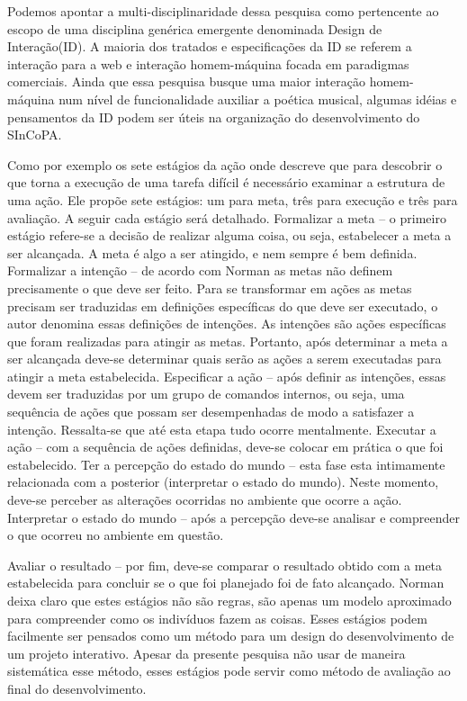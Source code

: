 \documentclass[draft]{ppgmus}
\begin{document}
Podemos apontar a multi-disciplinaridade dessa pesquisa como pertencente 
ao escopo de uma disciplina genérica emergente denominada Design de Interação(ID).
A maioria dos tratados e especificações da ID se referem a interação para a web
e interação homem-máquina focada em paradigmas comerciais. Ainda que essa pesquisa busque
uma maior interação homem-máquina num nível de funcionalidade auxiliar a poética musical, algumas idéias e 
pensamentos da ID podem ser úteis na organização do desenvolvimento do SInCoPA. 

Como por exemplo os sete estágios da ação \cite{norman06:design} onde descreve que para 
descobrir o que torna a
execução de uma tarefa difícil é necessário examinar a
estrutura de uma ação. Ele propõe sete estágios: um para
meta, três para execução e três para avaliação. A seguir cada
estágio será detalhado.
Formalizar a meta – o primeiro estágio refere-se a decisão de
realizar alguma coisa, ou seja, estabelecer a meta a ser
alcançada. A meta é algo a ser atingido, e nem sempre é bem
definida.
Formalizar a intenção – de acordo com Norman as
metas não definem precisamente o que deve ser feito. Para
se transformar em ações as metas precisam ser traduzidas
em definições específicas do que deve ser executado, o autor
denomina essas definições de intenções. As intenções são
ações específicas que foram realizadas para atingir as metas.
Portanto, após determinar a meta a ser alcançada deve-se
determinar quais serão as ações a serem executadas para
atingir a meta estabelecida.
Especificar a ação – após definir as intenções, essas devem
ser traduzidas por um grupo de comandos internos, ou seja,
uma sequência de ações que possam ser desempenhadas de
modo a satisfazer a intenção. Ressalta-se que até esta etapa
tudo ocorre mentalmente.
Executar a ação – com a sequência de ações definidas,
deve-se colocar em prática o que foi estabelecido.
Ter a percepção do estado do mundo – esta fase esta
intimamente relacionada com a posterior (interpretar o estado
do mundo). Neste momento, deve-se perceber as alterações
ocorridas no ambiente que ocorre a ação.
Interpretar o estado do mundo – após a percepção deve-se
analisar e compreender o que ocorreu no ambiente em
questão.

Avaliar o resultado – por fim, deve-se comparar o resultado
obtido com a meta estabelecida para concluir se o que foi
planejado foi de fato alcançado.
Norman deixa claro que estes estágios não são regras,
são apenas um modelo aproximado para compreender como
os indivíduos fazem as coisas. Esses estágios podem facilmente
ser pensados como um método para um design do desenvolvimento 
de um projeto interativo. Apesar da presente pesquisa não usar de 
maneira sistemática esse método, esses estágios pode servir como
método de avaliação ao final do desenvolvimento.
\end{document}
